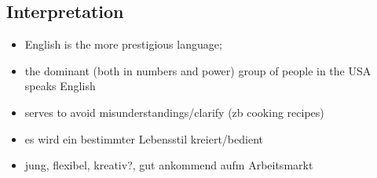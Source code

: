 \subsection{Interpretation}

\begin{itemize}
  \item English is the more prestigious language;
  \item the dominant (both in numbers and power) group of people in the USA speaks English
  \item serves to avoid misunderstandings/clarify (zb cooking recipes)
  \item es wird ein bestimmter Lebensstil kreiert/bedient
  \item jung, flexibel, kreativ?, gut ankommend aufm Arbeitsmarkt
\end{itemize}

\begin{comment}
Language Shift (Spanish -> English) : Speech community of a language shifts to speaking another language (source? Thomason?)
Can we talk about language shift in this context?
Who is shifting? The editors of the magazine? Or do they induce language shift?
Should that be a focus at all? Or focus more on communities of practice/style projection through language/sozioindexikalität, etc.

Ein Shift Spanisch->Englisch ist nicht nur mit Prestige zu erklären, sondern auch mit allgemeinen Anpassungs/Integrationsprozessen:
Wer in den USA Englisch kann, hat bessere Chancen einen Job zu finden, etc. na, aber das hat wohl auch mit Prestige zu tun gewissermaßen

English is the more prestigious language;
the dominant(both in numbers and power) group of people in the USA speaks English
serves to avoid misunderstandings/clarify (zb cooking recipes)
--> das kommt alles zur Interpretation!


\end{comment}

